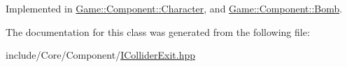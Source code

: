 Implemented in \mbox{\hyperlink{class_game_1_1_component_1_1_character_afe4232175cd33c92027adacba5217b16}{Game\+::\+Component\+::\+Character}}, and \mbox{\hyperlink{class_game_1_1_component_1_1_bomb_a73e1089e8b6be42c0357beda3ab6ccfa}{Game\+::\+Component\+::\+Bomb}}.



The documentation for this class was generated from the following file\+:\begin{DoxyCompactItemize}
\item 
include/\+Core/\+Component/\mbox{\hyperlink{_i_collider_exit_8hpp}{I\+Collider\+Exit.\+hpp}}\end{DoxyCompactItemize}
